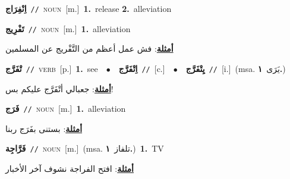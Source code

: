 \documentclass[10pt,a4paper,twoside]{article} %
\begin{document}
\begin{multicols}{2}
{\setlength\topsep{0pt}\textbf{\foreignlanguage{arabic}{اِنْفِرَاج}}\ {\color{gray}\texttt{//}\color{black}}\ \textsc{noun}\ [m.]\ \textbf{1.}~release  \textbf{2.}~alleviation\ } \vspace{2mm}

{\setlength\topsep{0pt}\textbf{\foreignlanguage{arabic}{تَفْرِيج}}\ {\color{gray}\texttt{//}\color{black}}\ \textsc{noun}\ [m.]\ \textbf{1.}~alleviation\  \begin{flushright}\color{gray}\foreignlanguage{arabic}{\textbf{\underline{\foreignlanguage{arabic}{أمثلة}}}: فش عمل أعظم من التَّفْريج عن المسلمين}\end{flushright}\color{black}} \vspace{2mm}

{\setlength\topsep{0pt}\textbf{\foreignlanguage{arabic}{تْفَرَّج}}\ {\color{gray}\texttt{//}\color{black}}\ \textsc{verb}\ [p.]\ \textbf{1.}~see\ \ $\bullet$\ \ \setlength\topsep{0pt}\textbf{\foreignlanguage{arabic}{اِتْفَرَّج}}\ {\color{gray}\texttt{//}\color{black}}\ [c.]\ \ $\bullet$\ \ \setlength\topsep{0pt}\textbf{\foreignlanguage{arabic}{يِتْفَرَّج}}\ {\color{gray}\texttt{//}\color{black}}\ [i.]\ \color{gray}(msa. \foreignlanguage{arabic}{يَرَى}~\foreignlanguage{arabic}{\textbf{١.}})\color{black}\  \begin{flushright}\color{gray}\foreignlanguage{arabic}{\textbf{\underline{\foreignlanguage{arabic}{أمثلة}}}: جعبالي أتْفَرَّج عليكم بس!}\end{flushright}\color{black}} \vspace{2mm}

{\setlength\topsep{0pt}\textbf{\foreignlanguage{arabic}{فَرَج}}\ {\color{gray}\texttt{//}\color{black}}\ \textsc{noun}\ [m.]\ \textbf{1.}~alleviation\  \begin{flushright}\color{gray}\foreignlanguage{arabic}{\textbf{\underline{\foreignlanguage{arabic}{أمثلة}}}: بستنى بفَرَج ربنا}\end{flushright}\color{black}} \vspace{2mm}

{\setlength\topsep{0pt}\textbf{\foreignlanguage{arabic}{فَرَّاجِة}}\ {\color{gray}\texttt{//}\color{black}}\ \textsc{noun}\ [m.]\ \color{gray}(msa. \foreignlanguage{arabic}{تلفاز}~\foreignlanguage{arabic}{\textbf{١.}})\color{black}\ \textbf{1.}~TV\  \begin{flushright}\color{gray}\foreignlanguage{arabic}{\textbf{\underline{\foreignlanguage{arabic}{أمثلة}}}: افتح الفراجة نشوف آخر الأخبار}\end{flushright}\color{black}} \vspace{2mm}


\end{multicols}
\end{document}
